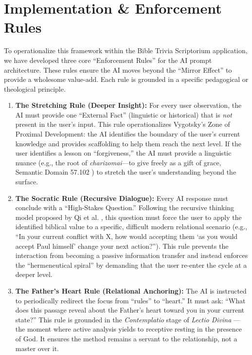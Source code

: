 \section{Implementation \& Enforcement Rules}
To operationalize this framework within the Bible Trivia Scriptorium application, we have developed three core ``Enforcement Rules'' for the AI prompt architecture. These rules ensure the AI moves beyond the ``Mirror Effect'' \cite{bender2021parrots} to provide a wholesome value-add. Each rule is grounded in a specific pedagogical or theological principle.

\begin{enumerate}
    \item \textbf{The Stretching Rule (Deeper Insight):} For every user observation, the AI must provide one ``External Fact'' (linguistic or historical) that is \textit{not} present in the user's input. This rule operationalizes Vygotsky's \cite{vygotsky1978} Zone of Proximal Development: the AI identifies the boundary of the user's current knowledge and provides scaffolding to help them reach the next level. If the user identifies a lesson on ``forgiveness,'' the AI must provide a linguistic nuance (e.g., the root of \textit{charizomai}---to give freely as a gift of grace, Semantic Domain 57.102 \cite{louwnida1988}) to stretch the user's understanding beyond the surface.
    
    \item \textbf{The Socratic Rule (Recursive Dialogue):} Every AI response must conclude with a ``High-Stakes Question.'' Following the recursive thinking model proposed by Qi et al. \cite{qi2023socratic}, this question must force the user to apply the identified biblical value to a specific, difficult modern relational scenario (e.g., ``In your current conflict with X, how would accepting them `as you would accept Paul himself' change your next action?''). This rule prevents the interaction from becoming a passive information transfer and instead enforces the ``hermeneutical spiral'' \cite{osborne2006} by demanding that the user re-enter the cycle at a deeper level.
    
    \item \textbf{The Father's Heart Rule (Relational Anchoring):} The AI is instructed to periodically redirect the focus from ``rules'' to ``heart.'' It must ask: ``What does this passage reveal about the Father's heart toward you in your current state?'' This rule is grounded in the \textit{Contemplatio} stage of \textit{Lectio Divina} \cite{guigo1150}---the moment where active analysis yields to receptive resting in the presence of God. It ensures the method remains a servant to the relationship, not a master over it.
\end{enumerate}


